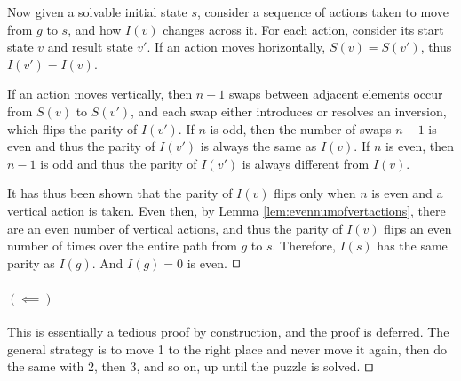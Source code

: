 \documentclass[runningheads]{llncs}
\begin{document}
Now given a solvable initial state $s$, consider a sequence of actions taken to move from $g$ to $s$, and how $I(v)$ changes across it. For each action, consider its start state $v$ and result state $v'$. If an action moves horizontally, $S(v) = S(v')$, thus $I(v') = I(v)$.

If an action moves vertically, then $n-1$ swaps between adjacent elements occur from $S(v)$ to $S(v')$, and each swap either introduces or resolves an inversion, which flips the parity of $I(v')$. If $n$ is odd, then the number of swaps $n-1$ is even and thus the parity of $I(v')$ is always the same as $I(v)$. If $n$ is even, then $n-1$ is odd and thus the parity of $I(v')$ is always different from $I(v)$.

It has thus been shown that the parity of $I(v)$ flips only when $n$ is even and a vertical action is taken. Even then, by Lemma \ref{lem:evennumofvertactions}, there are an even number of vertical actions, and thus the parity of $I(v)$ flips an even number of times over the entire path from $g$ to $s$. Therefore, $I(s)$ has the same parity as $I(g)$. And $I(g) = 0$ is even.
$\qed$

\paragraph{$(\impliedby)$}
This is essentially a tedious proof by construction, and the proof is deferred. The general strategy is to move 1 to the right place and never move it again, then do the same with 2, then 3, and so on, up until the puzzle is solved.
$\qed$






\end{document}
